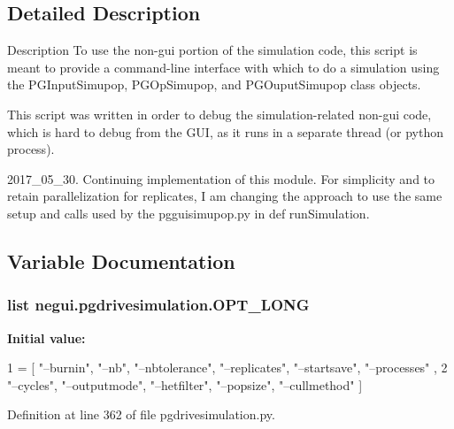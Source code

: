 \subsection{Detailed Description}
\begin{DoxyVerb}Description
To use the non-gui portion of the simulation code,
this script is meant to provide a command-line
interface with which to do a simulation using
the PGInputSimupop, PGOpSimupop, and PGOuputSimupop
class objects.

This script was written in order to debug the 
simulation-related non-gui code, which is hard
to debug from the GUI, as it runs in a separate
thread (or python process).


2017_05_30. Continuing implementation of this module.
For simplicity and to retain parallelization for replicates,
I am changing the approach to use the same setup and
calls used by the pgguisimupop.py in def runSimulation.
\end{DoxyVerb}
 

\subsection{Variable Documentation}
\subsubsection[{\texorpdfstring{O\+P\+T\+\_\+\+L\+O\+NG}{OPT_LONG}}]{\setlength{\rightskip}{0pt plus 5cm}list negui.\+pgdrivesimulation.\+O\+P\+T\+\_\+\+L\+O\+NG}\hypertarget{namespacenegui_1_1pgdrivesimulation_ab33f6f5eff26a00933ffca9555ade212}{}\label{namespacenegui_1_1pgdrivesimulation_ab33f6f5eff26a00933ffca9555ade212}
{\bfseries Initial value\+:}
\begin{DoxyCode}
1 = [ \textcolor{stringliteral}{"--burnin"}, \textcolor{stringliteral}{"--nb"}, \textcolor{stringliteral}{"--nbtolerance"}, \textcolor{stringliteral}{"--replicates"}, \textcolor{stringliteral}{"--startsave"}, \textcolor{stringliteral}{"--processes"} , 
2                                                     \textcolor{stringliteral}{"--cycles"}, \textcolor{stringliteral}{"--outputmode"}, \textcolor{stringliteral}{"--hetfilter"}, \textcolor{stringliteral}{"--popsize"},
       \textcolor{stringliteral}{"--cullmethod"} ]
\end{DoxyCode}


Definition at line 362 of file pgdrivesimulation.\+py.

